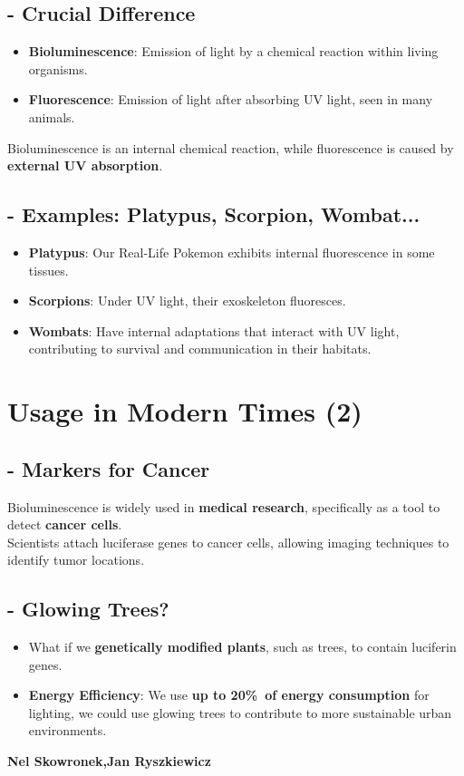 \documentclass{article}
\begin{document}
\subsection*{- Crucial Difference }
\begin{itemize}
 \item\textbf{Bioluminescence}: Emission of light by a chemical reaction within living organisms.
 \item\textbf{Fluorescence}: Emission of light after absorbing UV light, seen in many animals.
\end{itemize}
  
Bioluminescence is an internal chemical reaction, while fluorescence is caused by \textbf{external UV absorption}.

\subsection*{- Examples: Platypus, Scorpion, Wombat... }
\begin{itemize}
 \item\textbf{Platypus}: Our Real-Life Pokemon exhibits internal fluorescence in some tissues.
 \item\textbf{Scorpions}: Under UV light, their exoskeleton fluoresces.
 \item\textbf{Wombats}: Have internal adaptations that interact with UV light, contributing to survival and communication in their habitats.
\end{itemize}


\section*{Usage in Modern Times (2)}

\subsection*{- Markers for Cancer }
Bioluminescence is widely used in \textbf{medical research}, specifically as a tool to detect \textbf{cancer cells}.\\ 
Scientists attach luciferase genes to cancer cells, allowing imaging techniques to identify tumor locations.

\subsection*{- Glowing Trees? }
\begin{itemize}
 \item What if we \textbf{genetically modified plants}, such as trees, to contain luciferin genes.
 \item \textbf{Energy Efficiency}: We use \textbf{up to 20\%\ of energy consumption} for lighting, 
   we could use glowing trees to contribute to more sustainable urban environments.
\end{itemize}

\hfill
\textbf{Nel Skowronek,Jan Ryszkiewicz}
\end{document}
